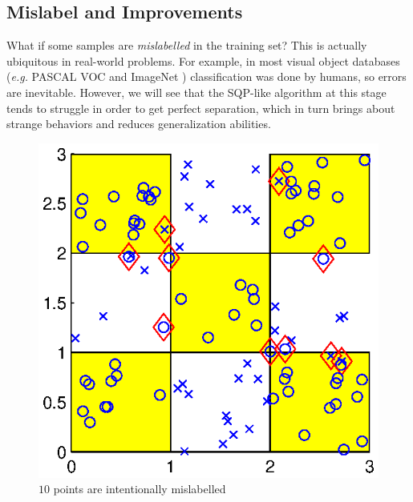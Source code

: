 \documentclass[11pt,a4paper]{article}
\theoremstyle{definition}
\begin{document}
    \subsection{Mislabel and Improvements\label{Sec:Issues}}
      What if some samples are \textit{mislabelled} in the training set? This is actually ubiquitous in real-world problems. For example, in most visual object databases (\textit{e.g.} PASCAL VOC \cite{everingham2010pascal} and ImageNet \cite{deng2009imagenet}) classification was done by humans, so errors are inevitable. However, we will see that the SQP-like algorithm at this stage tends to struggle in order to get perfect separation, which in turn brings about strange behaviors and reduces generalization abilities.

      \begin{figure}[htbp]
        \centering
        \begin{minipage}[t]{0.31\linewidth}
          \centering
          \includegraphics[width=1\textwidth]{4_3x3_mislabel.eps}
          \caption{\label{Fig:ex5_1}$10$ points are intentionally mislabelled}
        \end{minipage}
        \begin{minipage}[t]{0.31\linewidth}
          \centering

\end{minipage}
\end{figure}
\end{document}
